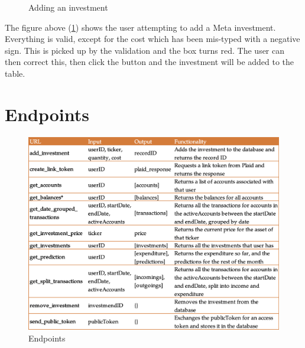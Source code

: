 \begin{figure}[H]
	\centering
	\caption{Adding an investment}
	\label{fig:InvestmentsError}
\end{figure}

The figure above (\ref{fig:InvestmentsError}) shows the user attempting to add a Meta investment. Everything is valid, except for the cost which has been mis-typed with a negative sign. This is picked up by the validation and the box turns red. The user can then correct this, then click the button and the investment will be added to the table.

\section{Endpoints}
\begin{figure}
	\centering
	\includegraphics[width=\textwidth]{images/Endpoints.png}
	\caption{Endpoints}
	\label{fig:Endpoints}
\end{figure}
